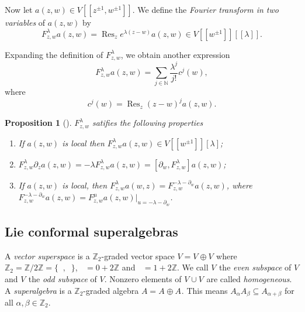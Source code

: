 \documentclass[a4paper, 12pt, reqno]{amsart}
\newtheorem{proposition}[theorem]{Proposition}
\theoremstyle{remark}
\numberwithin{equation}{subsection}
\DeclareMathOperator{\Res}{Res}
\DeclareMathOperator{\zero}{\overline{0}}
\DeclareMathOperator{\one}{\overline{1}}
\begin{document}
Now let $a(z, w) \in V[[z^{\pm 1}, w^{\pm 1}]]$.
We define the \emph{Fourier transform in two variables} of $a(z, w)$ by
\begin{equation*}
  F^\lambda_{z, w}a(z, w) = \Res_ze^{\lambda(z - w)}a(z, w) \in V[[w^{\pm 1}]][[\lambda]].
\end{equation*}

Expanding the definition of $F^\lambda_{z, w}$, we obtain another expression
\begin{equation*}
  F^\lambda_{z, w}a(z, w) = \sum_{j \in \mathbb{N}}\frac{\lambda^j}{j!}c^j(w),
\end{equation*}
where
\begin{equation*}
  c^j(w) = \Res_z(z - w)^ja(z, w).
\end{equation*}
\begin{proposition}[{\cite[Proposition 1.5.4]{nozaradan_introduction_2008}}]
  \label{prp:2}
  $F^\lambda_{z, w}$ satifies the following properties
  \begin{enumerate}
  \item If $a(z, w)$ is local then $F^\lambda_{z, w}a(z, w) \in V[[w^{\pm 1}]][\lambda]$;
  \item $F^\lambda_{z, w}\partial_za(z, w) = -\lambda F^\lambda_{z, w}a(z, w) = [\partial_w, F^{\lambda}_{z, w}]a(z, w)$;
  \item If $a(z, w)$ is local, then $F^\lambda_{z, w}a(w, z) = F^{-\lambda - \partial_w}_{z, w}a(z, w)$, where $F^{-\lambda - \partial_w}_{z, w}a(z, w) = F^\mu_{z, w}a(z, w)|_{u = -\lambda - \partial_w}$.
  \end{enumerate}
\end{proposition}

\subsection{Lie conformal superalgebras}
\label{sec:lie-conf-super}

A \emph{vector superspace} is a $\mathbb{Z}_2$-graded vector space $V = V_{\zero} \oplus V_{\one}$ where $\mathbb{Z}_2 = \mathbb{Z}/2\mathbb{Z} = \{\zero, \one\}$, $\zero = 0 + 2\mathbb{Z}$ and $\one = 1 + 2\mathbb{Z}$.
We call $V_{\zero}$ the \emph{even subspace} of $V$ and $V_{\one}$ the \emph{odd subspace} of $V$.
Nonzero elements of $V_{\zero}\cup V_{\one}$ are called \emph{homogeneous}.
A \emph{superalgebra} is a $\mathbb{Z}_2$-graded algebra $A = A_{\zero} \oplus A_{\one}$.
This means $A_{\alpha}A_{\beta} \subseteq A_{\alpha + \beta}$ for all $\alpha, \beta \in \mathbb{Z}_2$.
\end{document}
